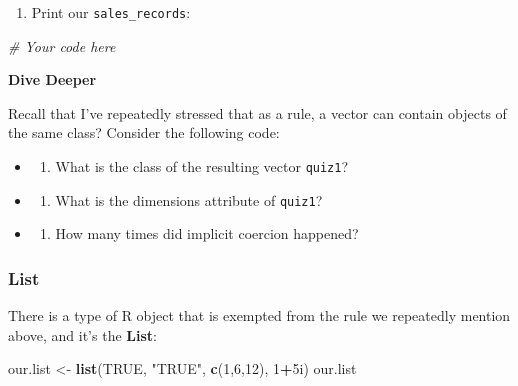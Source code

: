 \documentclass[]{article}
\newenvironment{Shaded}{\begin{snugshade}}{\end{snugshade}}
\newcommand{\CommentTok}[1]{\textcolor[rgb]{0.56,0.35,0.01}{\textit{#1}}}
\newcommand{\DecValTok}[1]{\textcolor[rgb]{0.00,0.00,0.81}{#1}}
\newcommand{\KeywordTok}[1]{\textcolor[rgb]{0.13,0.29,0.53}{\textbf{#1}}}
\newcommand{\NormalTok}[1]{#1}
\newcommand{\OperatorTok}[1]{\textcolor[rgb]{0.81,0.36,0.00}{\textbf{#1}}}
\newcommand{\OtherTok}[1]{\textcolor[rgb]{0.56,0.35,0.01}{#1}}
\newcommand{\StringTok}[1]{\textcolor[rgb]{0.31,0.60,0.02}{#1}}
\providecommand{\tightlist}{%
  \setlength{\itemsep}{0pt}\setlength{\parskip}{0pt}}
\begin{document}
\begin{enumerate}
\def\labelenumi{\arabic{enumi}.}
\setcounter{enumi}{2}
\tightlist
\item
  Print our \texttt{sales\_records}:
\end{enumerate}

\begin{Shaded}
\begin{Highlighting}[]
\CommentTok{# Your code here}
\end{Highlighting}
\end{Shaded}

\textbf{Dive Deeper}

Recall that I've repeatedly stressed that as a rule, a vector can
contain objects of the same class? Consider the following code:

\begin{itemize}
\item
  \begin{enumerate}
  \def\labelenumi{\arabic{enumi}.}
  \tightlist
  \item
    What is the class of the resulting vector \texttt{quiz1}?
  \end{enumerate}
\item
  \begin{enumerate}
  \def\labelenumi{\arabic{enumi}.}
  \setcounter{enumi}{1}
  \tightlist
  \item
    What is the dimensions attribute of \texttt{quiz1}?\\
  \end{enumerate}
\item
  \begin{enumerate}
  \def\labelenumi{\arabic{enumi}.}
  \setcounter{enumi}{2}
  \tightlist
  \item
    How many times did implicit coercion happened?
  \end{enumerate}
\end{itemize}

\hypertarget{list}{%
\subsubsection{List}\label{list}}

There is a type of R object that is exempted from the rule we repeatedly
mention above, and it's the \textbf{List}:

\begin{Shaded}
\begin{Highlighting}[]
\NormalTok{our.list <-}\StringTok{ }\KeywordTok{list}\NormalTok{(}\OtherTok{TRUE}\NormalTok{, }\StringTok{"TRUE"}\NormalTok{, }\KeywordTok{c}\NormalTok{(}\DecValTok{1}\NormalTok{,}\DecValTok{6}\NormalTok{,}\DecValTok{12}\NormalTok{), }\DecValTok{1}\OperatorTok{+}\NormalTok{5i)}
\NormalTok{our.list}
\end{Highlighting}
\end{Shaded}
\end{document}
